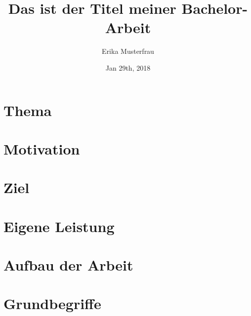 \documentclass[11pt,twoside,a4paper,titlepage]{article}
\title{{Das ist der Titel meiner Bachelor-Arbeit}}
\author{Erika Musterfrau}
\date{Jan 29th, 2018}
\begin{document}
\setlength{\parindent}{0pt}






\newpage

\pagestyle{fancy}


\tableofcontents

\fancyhead[RO,LE]{\nouppercase{\leftmark}}
\fancyfoot[RO,LE]{\thepage}

\renewcommand{\headrulewidth}{0.5pt}

\setcounter{page}{1}

\newpage



\section{Thema}


\section{Motivation}


\section{Ziel}


\section{Eigene Leistung}


\section{Aufbau der Arbeit}


\section{Grundbegriffe}

\end{document}
